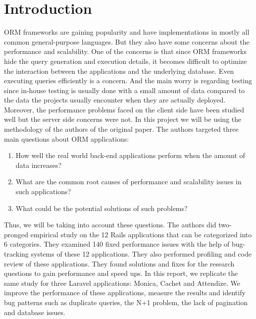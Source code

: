 \documentclass[sigconf]{acmart}
\begin{document}

\maketitle

\section{Introduction}
ORM frameworks are gaining popularity and have implementations in mostly all common general-purpose languages. But they also have some concerns about the performance and scalability. One of the concerns is that since ORM frameworks hide the query generation and execution details, it becomes difficult to optimize the interaction between the applications and the underlying database. Even executing queries efficiently is a concern. And the main worry is regarding testing since in-house testing is usually done with a small amount of data compared to the data the projects usually encounter when they are actually deployed. Moreover, the performance problems faced on the client side have been studied well but the server side concerns were not. In this project we will be using the methodology of the authors of the original paper. The authors targeted three main questions about ORM applications:
\begin{enumerate}
\item How well the real world back-end applications perform when the amount of data increases?
\item What are the common root causes of performance and scalability issues in such applications?
\item What could be the potential solutions of such problems?
\end{enumerate}
Thus, we will be taking into account these questions. The authors did two-pronged empirical study on the 12 Rails applications that can be categorized into 6 categories. They examined 140 fixed performance issues with the help of bug-tracking systems of these 12 applications. They also performed profiling and code review of these applications. They found solutions and fixes for the research questions to gain performance and speed ups. In this report, we replicate the same study for three Laravel applications: Monica, Cachet and Attendize. We improve the performance of these applications, measure the results and identify bug patterns such as duplicate queries, the N+1 problem, the lack of pagination and database issues.
\end{document}
